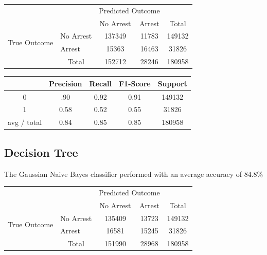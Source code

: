 \documentclass[10pt]{SelfArx} %
\begin{document}
    \begin{tabular}{l|l|c|c|c}
    \multicolumn{2}{c}{}&\multicolumn{2}{c}{Predicted Outcome}&\\
    \cline{3-4}
    \multicolumn{2}{c|}{}&No Arrest&Arrest&\multicolumn{1}{c}{Total}\\
    \cline{2-4}
    \multirow{2}{*}{True Outcome}& No Arrest & 137349 & 11783 & 149132\\
    \cline{2-4}
    & Arrest & 15363 & 16463 & 31826\\
    \cline{2-4}
    \multicolumn{1}{c}{} & \multicolumn{1}{c}{Total} & \multicolumn{1}{c}{152712} & \multicolumn{    1}{c}{28246}&     \multicolumn{1}{c}{180958}\\
    \end{tabular}

    \begin{center}
        \begin{tabular}{|c | c | c | c| c|}
        \hline
        & Precision & Recall & F1-Score & Support \\ [0.5ex]
        \hline\hline
        0 & .90 & 0.92 & 0.91 & 149132 \\
        \hline
        1 & 0.58 & 0.52 & 0.55 & 31826 \\
        \hline
        avg / total & 0.84 & 0.85 & 0.85 & 180958 \\
        \hline
        \hline
        \end{tabular}
    \end{center}

    \subsection{Decision Tree}
    The Gaussian Naive Bayes classifier performed with an average accuracy of 84.8\%

    \begin{tabular}{l|l|c|c|c}
    \multicolumn{2}{c}{}&\multicolumn{2}{c}{Predicted Outcome}&\\
    \cline{3-4}
    \multicolumn{2}{c|}{}&No Arrest&Arrest&\multicolumn{1}{c}{Total}\\
    \cline{2-4}
    \multirow{2}{*}{True Outcome}& No Arrest & 135409 & 13723 & 149132\\
    \cline{2-4}
    & Arrest & 16581 & 15245 & 31826\\
    \cline{2-4}
    \multicolumn{1}{c}{} & \multicolumn{1}{c}{Total} & \multicolumn{1}{c}{151990} & \multicolumn{    1}{c}{28968} &     \multicolumn{1}{c}{180958}\\
    \end{tabular}
\end{document}
